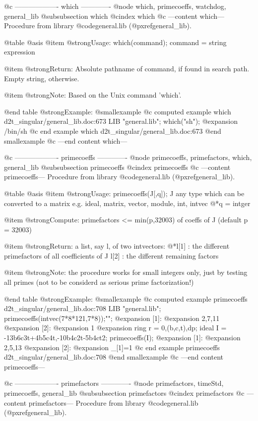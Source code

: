 @c ------------------- which -------------
@node which, primecoeffs, watchdog, general_lib
@subsubsection which
@cindex which
@c ---content which---
Procedure from library @code{general.lib} (@pxref{general_lib}).

@table @asis
@item @strong{Usage:}
which(command); command = string expression

@item @strong{Return:}
Absolute pathname of command, if found in search path.
Empty string, otherwise.

@item @strong{Note:}
Based on the Unix command 'which'.

@end table
@strong{Example:}
@smallexample
@c computed example which d2t_singular/general_lib.doc:673 
LIB "general.lib";
which("sh");
@expansion{} /bin/sh
@c end example which d2t_singular/general_lib.doc:673
@end smallexample
@c ---end content which---

@c ------------------- primecoeffs -------------
@node primecoeffs, primefactors, which, general_lib
@subsubsection primecoeffs
@cindex primecoeffs
@c ---content primecoeffs---
Procedure from library @code{general.lib} (@pxref{general_lib}).

@table @asis
@item @strong{Usage:}
primecoeffs(J[,q]); J any type which can be converted to a matrix
e.g. ideal, matrix, vector, module, int, intvec
@*q = intger

@item @strong{Compute:}
primefactors <= min(p,32003) of coeffs of J (default p = 32003)

@item @strong{Return:}
a list, say l, of two intvectors:
@*l[1] : the different primefactors of all coefficients of J
l[2] : the different remaining factors

@item @strong{Note:}
the procedure works for small integers only, just by testing all
primes (not to be considerd as serious prime factorization!)

@end table
@strong{Example:}
@smallexample
@c computed example primecoeffs d2t_singular/general_lib.doc:708 
LIB "general.lib";
primecoeffs(intvec(7*8*121,7*8));"";
@expansion{} [1]:
@expansion{}    2,7,11
@expansion{} [2]:
@expansion{}    1
@expansion{} 
ring r = 0,(b,c,t),dp;
ideal I = -13b6c3t+4b5c4t,-10b4c2t-5b4ct2;
primecoeffs(I);
@expansion{} [1]:
@expansion{}    2,5,13
@expansion{} [2]:
@expansion{}    _[1]=1
@c end example primecoeffs d2t_singular/general_lib.doc:708
@end smallexample
@c ---end content primecoeffs---

@c ------------------- primefactors -------------
@node primefactors, timeStd, primecoeffs, general_lib
@subsubsection primefactors
@cindex primefactors
@c ---content primefactors---
Procedure from library @code{general.lib} (@pxref{general_lib}).

